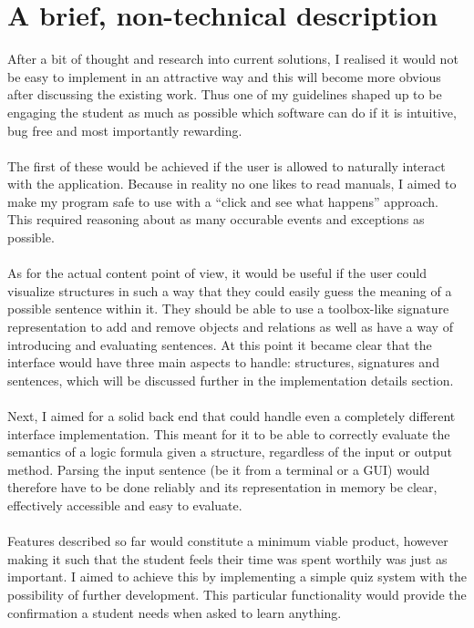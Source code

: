 \documentclass{report}
\begin{document}
\section{A brief, non-technical description}
After a bit of thought and research into current solutions, I realised it would 
not be easy to implement in an attractive way and this will become more obvious 
after discussing the existing work. Thus one of my guidelines shaped up to be 
engaging the student as much as possible which software can do if it is 
intuitive, bug free and most importantly rewarding. 
\\ \\
The first of these would be achieved if the user is allowed to naturally 
interact with the application. Because in reality no one likes to read manuals, 
I aimed to make my program safe to use with a ``click and see what happens'' 
approach. This required reasoning about as many occurable events and exceptions 
as possible. 
\\ \\ 
As for the actual content point of view, it would be useful if the user 
could visualize structures in such a way that they could easily guess the 
meaning of a possible sentence within it. They should be able to use a 
toolbox-like signature representation to add and remove objects and relations as 
well as have a way of introducing and evaluating sentences. At this point it 
became clear that the interface would have three main aspects to handle: 
structures, signatures and sentences, which will be discussed further in the 
implementation details section. 
\\ \\
Next, I aimed for a solid back end that could handle even a completely different 
interface implementation. This meant for it to be able to correctly evaluate the 
semantics of a logic formula given a structure, regardless of the input or 
output method. Parsing the input sentence (be it from a terminal or a GUI) would 
therefore have to be done reliably and its representation in memory be clear, 
effectively accessible and easy to evaluate. 
\\ \\
Features described so far would constitute a minimum viable product, however 
making it such that the student feels their time was spent worthily was just as 
important. I aimed to achieve this by implementing a simple quiz system with the 
possibility of further development. This particular functionality would provide 
the confirmation a student needs when asked to learn anything.
\end{document}
